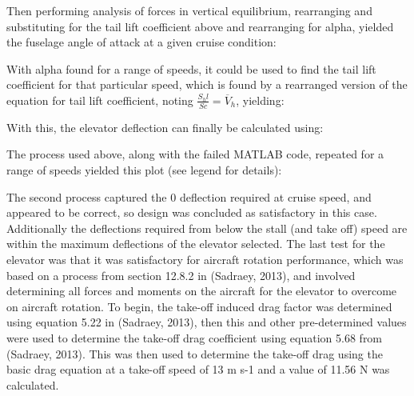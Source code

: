\documentclass[../../main.tex]{subfiles}
\begin{document}

Then performing analysis of forces in vertical equilibrium, rearranging and substituting for the tail lift coefficient above  and rearranging for alpha, yielded the fuselage angle of attack at a given cruise condition: 


With alpha found for a range of speeds, it could be used to find the tail lift coefficient for that particular speed, which is found by a rearranged version of the equation for tail lift coefficient, noting $\frac{S_h l}{Sc} = \overline{V}_h$, yielding: 


With this, the elevator deflection can finally be calculated using:


The process used above, along with the failed MATLAB code, repeated for a range of speeds yielded this plot (see legend for details):


The second process captured the 0 deflection required at cruise speed, and appeared to be correct, so design was concluded as satisfactory in this case.
Additionally the deflections required from below the stall (and take off) speed are within the maximum deflections of the elevator selected.
The last test for the elevator was that it was satisfactory for aircraft rotation performance, which was based on a process from section 12.8.2 in (Sadraey, 2013), and involved determining all forces and moments on the aircraft for the elevator to overcome on aircraft rotation.
To begin, the take-off induced drag factor was determined using equation 5.22 in (Sadraey, 2013), then this and other pre-determined values were used to determine the take-off drag coefficient using equation 5.68 from (Sadraey, 2013).
This was then used to determine the take-off drag using the basic drag equation at a take-off speed of 13 m s-1 and a value of 11.56 N was calculated.  
\end{document}
